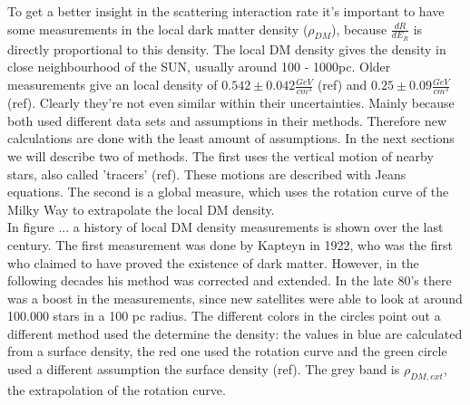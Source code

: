 \documentclass{article}
\begin{document}
To get a better insight in the scattering interaction rate it's important to have some measurements in the local dark matter density ($\rho_{DM}$), because $\frac{dR}{dE_{R}}$ is directly proportional to this density. The local DM density gives the density in close neighbourhood of the SUN, usually around 100 - 1000pc. Older measurements give an local density of $0.542 \pm 0.042 \frac{GeV}{cm^{3}}$ (ref) and $0.25 \pm 0.09 \frac{GeV}{cm^{3}}$ (ref). Clearly they're not even similar within their uncertainties. Mainly because both used different data sets and assumptions in their methods. Therefore new calculations are done with the least amount of assumptions. In the next sections we will describe two of methods. The first uses the vertical motion of nearby stars, also called 'tracers' (ref). These motions are described with Jeans equations. The second is a global measure, which uses the rotation curve of the Milky Way to extrapolate the local DM density. \\
In figure ... a history of local DM density measurements is shown over the last century. The first measurement was done by Kapteyn in 1922, who was the first who claimed to have proved the existence of dark matter. However, in the following decades his method was corrected and extended. In the late 80's there was a boost in the measurements, since new satellites were able to look at around 100.000 stars in a 100 pc radius. The different colors in the circles point out a different method used the determine the density: the values in blue are calculated from a surface density, the red one used the rotation curve and the green circle used a different assumption the surface density (ref). The grey band is $\rho_{DM,ext}$, the extrapolation of the rotation curve. 
\FloatBarrier
\end{document}
